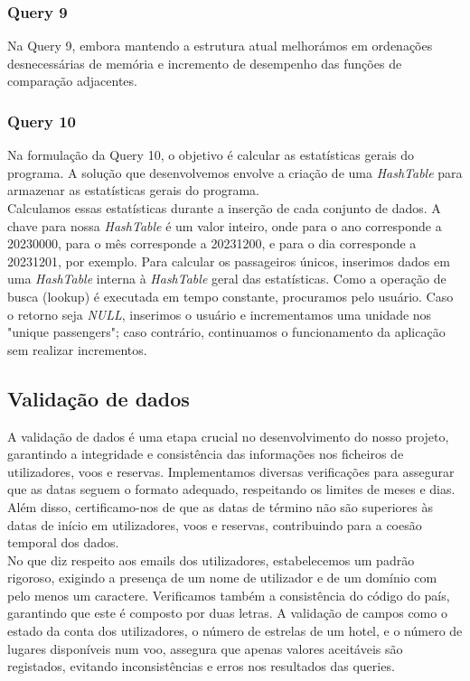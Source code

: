 \documentclass[12pt,a4paper]{article}
\begin{document}
    \subsubsection{Query 9}
    \hspace{0.6cm}Na Query 9, embora mantendo a estrutura atual melhorámos em ordenações desnecessárias de memória e incremento de desempenho das funções de comparação adjacentes.

    \subsubsection{Query 10}
    \hspace{0.6cm}Na formulação da Query 10, o objetivo é calcular as estatísticas gerais do programa. A solução que desenvolvemos envolve a criação de uma \textit{HashTable} para armazenar as estatísticas gerais do programa.  \\

    Calculamos essas estatísticas durante a inserção de cada conjunto de dados. A chave para nossa \textit{HashTable} é um valor inteiro, onde para o ano corresponde a 20230000, para o mês corresponde a 20231200, e para o dia corresponde a 20231201, por exemplo. Para calcular os passageiros únicos, inserimos dados em uma \textit{HashTable} interna à \textit{HashTable} geral das estatísticas. Como a operação de busca (lookup) é executada em tempo constante, procuramos pelo usuário. Caso o retorno seja \textit{NULL}, inserimos o usuário e incrementamos uma unidade nos "unique passengers"; caso contrário, continuamos o funcionamento da aplicação sem realizar incrementos.

    \subsection{Validação de dados}
    \hspace{0,6cm}A validação de dados é uma etapa crucial no desenvolvimento do nosso projeto, garantindo a integridade e consistência das informações nos ficheiros de utilizadores, voos e reservas. Implementamos diversas verificações para assegurar que as datas seguem o formato adequado, respeitando os limites de meses e dias. Além disso, certificamo-nos de que as datas de término não são superiores às datas de início em utilizadores, voos e reservas, contribuindo para a coesão temporal dos dados.\\

    No que diz respeito aos emails dos utilizadores, estabelecemos um padrão rigoroso, exigindo a presença de um nome de utilizador e de um domínio com pelo menos um caractere. Verificamos também a consistência do código do país, garantindo que este é composto por duas letras. A validação de campos como o estado da conta dos utilizadores, o número de estrelas de um hotel, e o número de lugares disponíveis num voo, assegura que apenas valores aceitáveis são registados, evitando inconsistências e erros nos resultados das queries.\\
\end{document}
